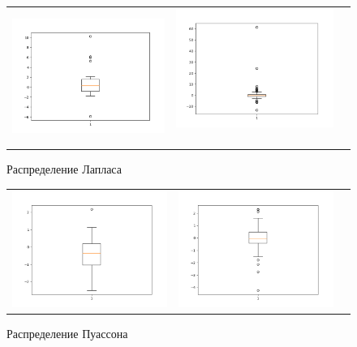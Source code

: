 \begin{figure}[H]
	\centering
	\begin{tabular}{ccc}
		\includegraphics[width=55mm, height =0.25\textheight]{pics/l20.png}
		&
		\includegraphics[width=55mm, height =0.25\textheight]{pics/l100.png}\
	\end{tabular}
	\caption{Распределение Лапласа}
	\label{fig:laplace}
\end{figure}


\begin{figure}[H]
	\centering
	\begin{tabular}{ccc}
		\includegraphics[width=55mm, height =0.25\textheight]{pics/p20.png}
		&
		\includegraphics[width=55mm, height =0.25\textheight]{pics/p100.png}
	\end{tabular}
	\caption{Распределение Пуассона}
	\label{fig:poisson}
\end{figure}


